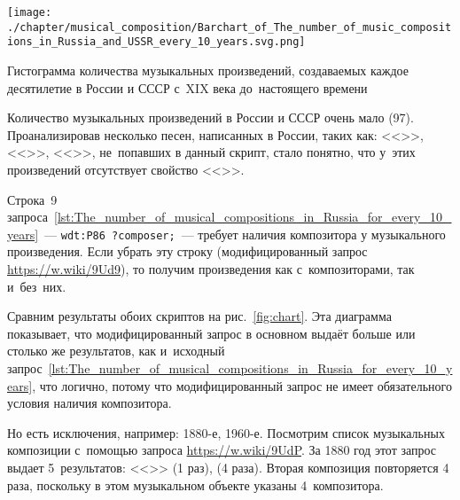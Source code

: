 \newpage

\begin{marginfigure}[0\baselineskip]
	\texttt{[image: ./chapter/musical\_composition/Barchart\_of\_The\_number\_of\_music\_compositions\_in\_Russia\_and\_USSR\_every\_10\_years.svg.png]}
    \vspace{-7pt}
	\caption{Гистограмма количества музыкальных произведений, 
             создаваемых каждое десятилетие в России и СССР с~XIX века до~настоящего времени}%
	\label{fig:diagram_10_yearsRussia}%

\end{marginfigure}

Количество музыкальных произведений в России и СССР очень мало (97). 
Проанализировав несколько песен, написанных в России, таких как: 
<<>>, 
<<>>, 
<<>>, 
не~попавших в данный скрипт, стало понятно, 
что у~этих произведений отсутствует свойство <<>>.

Строка~9 запроса~\ref{lst:The_number_of_musical_compositions_in_Russia_for_every_10_years}~---  
\lstinline|wdt:P86 ?composer;|~--- 
требует наличия композитора у музыкального произведения. 
Если убрать эту строку (модифицированный запрос \href{https://w.wiki/9Ud9}
                                                     {https://w.wiki/9Ud9}), 
то получим произведения как с~композиторами, так и~без~них. 

Сравним результаты обоих скриптов на рис.~\ref{fig:chart}. 
Эта диаграмма показывает, что модифицированный запрос 
в основном выдаёт больше или столько же результатов, 
как и~исходный запрос~\ref{lst:The_number_of_musical_compositions_in_Russia_for_every_10_years}, 
что логично, потому что модифицированный запрос не имеет обязательного условия наличия композитора. 

Но есть исключения, например: 1880-е, 1960-е. 
Посмотрим список музыкальных композиции с~помощью запроса \href{https://w.wiki/9UdP}
                                                               {https://w.wiki/9UdP}. 
За 1880 год этот запрос выдает 5~результатов: 
<<>> (1 раз), 
 (4 раза). 
Вторая композиция повторяется 4 раза, поскольку в этом музыкальном объекте указаны 4~композитора. 


